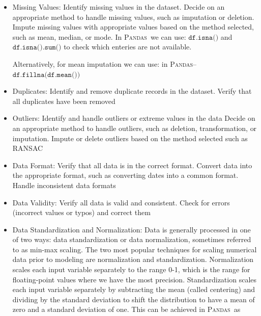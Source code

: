 \documentclass[11pt]{article}
\newcommand{\PAD}{\textsc{Pandas}}
\begin{document}
\begin{itemize}
\item Missing Values: Identify missing values in the dataset. Decide on an appropriate method to handle missing values, such as imputation or deletion. 
Impute missing values with appropriate values based on the method selected, such as mean, median, or mode. 
In \PAD~we can use: $\texttt{df.isna()}$ and $\texttt{df.isna().sum()}$ to check which enteries are not available. 

Alternatively, for mean imputation we can use:
in \PAD -- $\texttt{df.fillna(df.mean())}$


\begin{mdframed}[backgroundcolor=celadon!6]

\end{mdframed}



\item Duplicates: Identify and remove duplicate records in the dataset. Verify that all duplicates have been removed
\item Outliers: Identify and handle outliers or extreme values in the data Decide on an appropriate method to handle outliers, such as deletion, transformation, or imputation. Impute or delete outliers based on the method selected such as RANSAC
\item Data Format: Verify that all data is in the correct format. Convert data into the appropriate format, such as converting dates into a common format. Handle inconsistent data formats\
\item Data Validity: Verify all data is valid and consistent. Check for errors (incorrect values or typos) and correct them
\item Data Standardization and Normalization: Data is generally processed in one of two ways:  data standardization or data normalization, sometimes referred to as min-max scaling. The two most popular techniques for scaling numerical data prior to modeling are normalization and standardization. Normalization scales each input variable separately to the range 0-1, which is the range for floating-point values where we have the most precision. Standardization scales each input variable separately by subtracting the mean (called centering) and dividing by the standard deviation to shift the distribution to have a mean of zero and a standard deviation of one. This can be achieved in \PAD~as 
\end{itemize}
\end{document}

